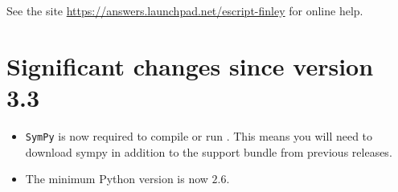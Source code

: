 See the site \url{https://answers.launchpad.net/escript-finley} for online help.

\section{Significant changes since version 3.3}
\begin{itemize}
 \item \texttt{SymPy} is now required to compile or run \escript. 
    This means you will need to download sympy in addition to the support bundle from previous releases.
 \item The minimum Python version is now $2.6$.
\end{itemize}

% 





